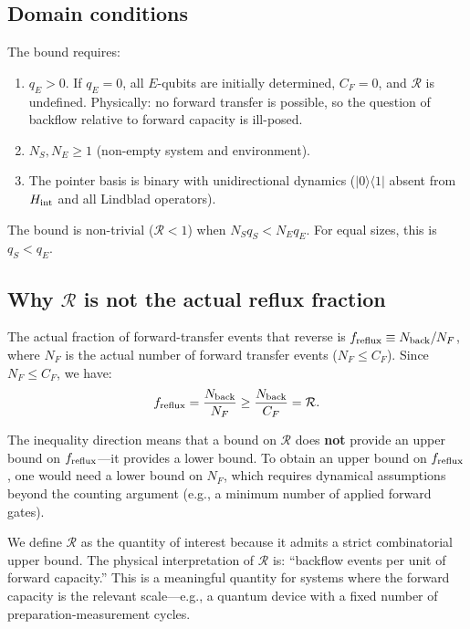 \documentclass[aps,pra,onecolumn]{revtex4-2}
\begin{document}
\subsection{Domain conditions}

The bound requires:
\begin{enumerate}
\item $q_E > 0$. If $q_E = 0$, all $E$-qubits are initially determined, $C_F = 0$, and $\mathcal{R}$ is undefined. Physically: no forward transfer is possible, so the question of backflow relative to forward capacity is ill-posed.
\item $N_S, N_E \geq 1$ (non-empty system and environment).
\item The pointer basis is binary with unidirectional dynamics ($|0\rangle\langle 1|$ absent from $H_{\rm int}$ and all Lindblad operators).
\end{enumerate}

The bound is non-trivial ($\mathcal{R} < 1$) when $N_S q_S < N_E q_E$. For equal sizes, this is $q_S < q_E$.

\subsection{Why $\mathcal{R}$ is not the actual reflux fraction}

The actual fraction of forward-transfer events that reverse is $f_{\rm reflux} \equiv N_{\rm back}/N_F$, where $N_F$ is the actual number of forward transfer events ($N_F \leq C_F$). Since $N_F \leq C_F$, we have:
\begin{equation}
f_{\rm reflux} = \frac{N_{\rm back}}{N_F} \geq \frac{N_{\rm back}}{C_F} = \mathcal{R}.
\end{equation}

The inequality direction means that a bound on $\mathcal{R}$ does \textbf{not} provide an upper bound on $f_{\rm reflux}$---it provides a lower bound. To obtain an upper bound on $f_{\rm reflux}$, one would need a lower bound on $N_F$, which requires dynamical assumptions beyond the counting argument (e.g., a minimum number of applied forward gates).

We define $\mathcal{R}$ as the quantity of interest because it admits a strict combinatorial upper bound. The physical interpretation of $\mathcal{R}$ is: ``backflow events per unit of forward capacity.'' This is a meaningful quantity for systems where the forward capacity is the relevant scale---e.g., a quantum device with a fixed number of preparation-measurement cycles.
\end{document}
